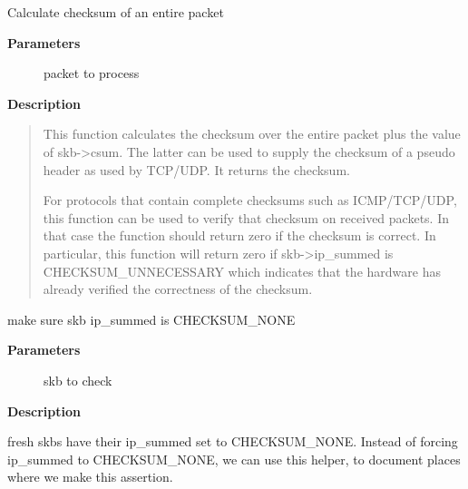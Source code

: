 \documentclass[a4paper,8pt,english]{sphinxmanual}
\begin{document}
\begin{fulllineitems}
\label{networking/kapi:c.skb_checksum_complete}
Calculate checksum of an entire packet

\end{fulllineitems}


\textbf{Parameters}
\begin{description}
\item[{}] \leavevmode
packet to process

\end{description}

\textbf{Description}
\begin{quote}

This function calculates the checksum over the entire packet plus
the value of skb-\textgreater{}csum.  The latter can be used to supply the
checksum of a pseudo header as used by TCP/UDP.  It returns the
checksum.

For protocols that contain complete checksums such as ICMP/TCP/UDP,
this function can be used to verify that checksum on received
packets.  In that case the function should return zero if the
checksum is correct.  In particular, this function will return zero
if skb-\textgreater{}ip\_summed is CHECKSUM\_UNNECESSARY which indicates that the
hardware has already verified the correctness of the checksum.
\end{quote}

\begin{fulllineitems}
\label{networking/kapi:c.skb_checksum_none_assert}
make sure skb ip\_summed is CHECKSUM\_NONE

\end{fulllineitems}


\textbf{Parameters}
\begin{description}
\item[{}] \leavevmode
skb to check

\end{description}

\textbf{Description}

fresh skbs have their ip\_summed set to CHECKSUM\_NONE.
Instead of forcing ip\_summed to CHECKSUM\_NONE, we can
use this helper, to document places where we make this assertion.
\end{document}
